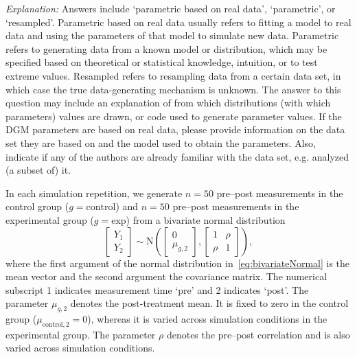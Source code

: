 \documentclass[12pt]{article}
\begin{document}
\textit{Explanation:} Answers include `parametric based on real data', `parametric', or `resampled'. Parametric based on real data usually refers to fitting a model to real data and using the parameters of that model to simulate new data. Parametric refers to generating data from a known model or distribution, which may be specified based on theoretical or statistical knowledge, intuition, or to test extreme values. Resampled refers to resampling data from a certain data set, in which case the true data-generating mechanism is unknown. The answer to this question may include an explanation of from which distributions (with which parameters) values are drawn, or code used to generate parameter values. If the DGM parameters are based on real data, please provide information on the data set they are based on and the model used to obtain the parameters. Also, indicate if any of the authors are already familiar with the data set, e.g. analyzed (a subset of) it.

\begin{examplebox}
In each simulation repetition, we generate $n=50$ pre--post measurements in the control group ($g = \text{control}$) and $n = 50$ pre--post measurements in the experimental group ($g = \text{exp}$) from a bivariate normal distribution
\begin{equation}
    \label{eq:bivariateNormal}
    \left[\begin{array}{c}Y_1 \\ Y_2 \end{array}\right] \sim\text{N}\left(\left[\begin{array}{c}0 \\ \mu_{g,2} \end{array}\right],\left[\begin{array}{cc} 1 & \rho  \\ \rho & 1 \end{array}\right]\right),
\end{equation}
where the first argument of the normal distribution in~\eqref{eq:bivariateNormal} is the mean vector and the second argument the covariance matrix.
The numerical subscript 1 indicates measurement time `pre' and 2 indicates `post'. The parameter $\mu_{g,2}$ denotes the post-treatment mean. It is fixed to zero in the control group (${\mu_{\text{control},2}} = 0$), whereas it is varied across simulation conditions in the experimental group. The parameter $\rho$ denotes the pre--post correlation and is also varied across simulation conditions.
\end{examplebox}
\end{document}
